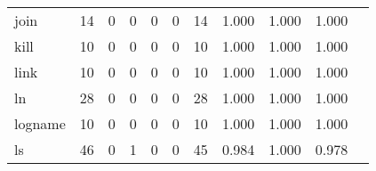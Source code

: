 \begin{longtable}{lp{1.2cm}p{1.2cm}p{1.2cm}p{1.2cm}p{1.2cm}p{1.2cm}p{1.2cm}p{1.2cm}p{1.2cm}p{1.2cm}}
join      &                                    14 &                                                  0 &                                                  0 &                                                  0 &                                                  0 &                                                 14 &                                         1.000 &                                              1.000 &                                              1.000 \\
kill      &                                    10 &                                                  0 &                                                  0 &                                                  0 &                                                  0 &                                                 10 &                                         1.000 &                                              1.000 &                                              1.000 \\
link      &                                    10 &                                                  0 &                                                  0 &                                                  0 &                                                  0 &                                                 10 &                                         1.000 &                                              1.000 &                                              1.000 \\
ln        &                                    28 &                                                  0 &                                                  0 &                                                  0 &                                                  0 &                                                 28 &                                         1.000 &                                              1.000 &                                              1.000 \\
logname   &                                    10 &                                                  0 &                                                  0 &                                                  0 &                                                  0 &                                                 10 &                                         1.000 &                                              1.000 &                                              1.000 \\
ls        &                                    46 &                                                  0 &                                                  1 &                                                  0 &                                                  0 &                                                 45 &                                         0.984 &                                              1.000 &                                              0.978 \\

\end{longtable}
